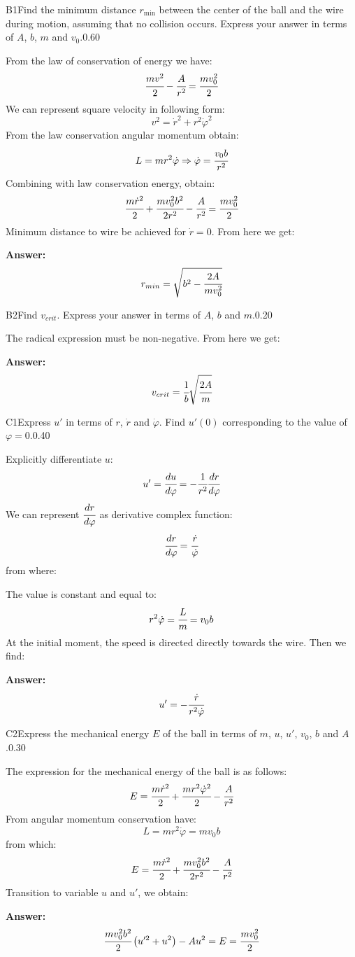 \documentclass[11pt,a4paper]{article}
\begin{document}
\begin{solcard}{B1}{Find the minimum distance $r_{\min}$ between the center of the ball and the wire during motion, assuming that no collision occurs. Express your answer in terms of $A$, $b$, $m$ and $v_0$.}{0.60}

From the law of conservation of energy we have: $$\cfrac{mv^2}{2}-\cfrac{A}{r^2}=\cfrac{mv^2_0}{2} $$ We can represent square velocity in following form: $$v^2=\dot{r}^2+r^2\dot{\varphi}^2 $$ From the law conservation angular momentum obtain: $$L=mr^2\dot{\varphi}\Rightarrow{\dot{\varphi}=\cfrac{v_0b}{r^2}} $$ Combining with law conservation energy, obtain: $$\cfrac{m\dot{r}^2}{2}+\cfrac{mv^2_0b^2}{2r^2}-\cfrac{A}{r^2}=\cfrac{mv^2_0}{2} $$ Minimum distance to wire be achieved for $\dot{r}=0$. From here we get:

\par\smallskip\noindent\textbf{Answer:} $$r_{min}=\sqrt{b^2-\cfrac{2A}{mv^2_0}} $$
\end{solcard}

\begin{solcard}{B2}{Find $v_{crit}$. Express your answer in terms of $A$, $b$ and $m$.}{0.20}

The radical expression must be non-negative. From here we get:

\par\smallskip\noindent\textbf{Answer:} $$v_{crit}=\cfrac{1}{b}\sqrt{\cfrac{2A}{m}} $$
\end{solcard}

\begin{solcard}{C1}{Express $u'$ in terms of $r$, $\dot{r}$ and $\dot{\varphi}$. Find $u'(0)$ corresponding to the value of $\varphi=0$.}{0.40}

Explicitly differentiate $u$: $$u'=\cfrac{du}{d\varphi}=-\cfrac{1}{r^2}\cfrac{dr}{d\varphi} $$ We can represent $\cfrac{dr}{d\varphi}$ as derivative complex function: $$\cfrac{dr}{d\varphi}=\cfrac{\dot{r}}{\dot{\varphi}} $$ from where:


The value is constant and equal to: $$r^2\dot{\varphi}=\cfrac{L}{m}=v_0b $$ At the initial moment, the speed is directed directly towards the wire. Then we find:

\par\smallskip\noindent\textbf{Answer:} $$u'=-\cfrac{\dot{r}}{r^2\dot{\varphi}} $$
\end{solcard}

\begin{solcard}{C2}{Express the mechanical energy $E$ of the ball in terms of $m$, $u$, $u'$, $v_0$, $b$ and $A$.}{0.30}

The expression for the mechanical energy of the ball is as follows: $$E=\cfrac{m\dot{r}^2}{2}+\cfrac{mr^2\dot{\varphi}^2}{2}-\cfrac{A}{r^2} $$ From angular momentum conservation have: $$L=mr^2\dot{\varphi}=mv_0b $$ from which: $$E=\cfrac{m\dot{r}^2}{2}+\cfrac{mv^2_0b^2}{2r^2}-\cfrac{A}{r^2} $$ Transition to variable $u$ and $u'$, we obtain:

\par\smallskip\noindent\textbf{Answer:} $$\cfrac{mv^2_0b^2}{2}\left(u'^2+u^2\right)-Au^2=E=\cfrac{mv^2_0}{2} $$
\end{solcard}
\end{document}
